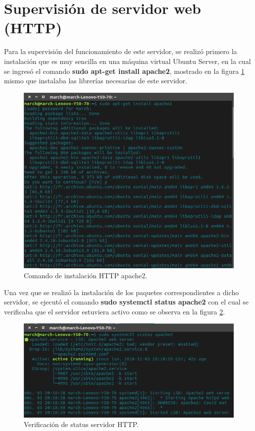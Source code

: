 \section{Supervisión de servidor web (HTTP)}
Para la supervisión del funcionamiento de este servidor, se realizó primero la instalación que es muy sencilla en una máquina virtual Ubuntu Server, en la cual se ingresó el comando \textbf{sudo apt-get install apache2}, mostrado en la figura \ref{image:http1} mismo que instalaba las librerías necesarias de este servidor.

\FloatBarrier
\begin{figure}[htbp!]
		\centering
			\includegraphics[width=.68 \textwidth]{images/http1}
		\caption{Comando de instalación HTTP apache2.}
		\label{image:http1}
\end{figure}
\FloatBarrier

Una vez que se realizó la instalación de los paquetes correspondientes a dicho servidor, se ejecutó el comando \textbf{sudo systemctl status apache2} con el cual se verificaba que el servidor estuviera activo como se observa en la figura \ref{image:http2}.

\FloatBarrier
\begin{figure}[htbp!]
		\centering
			\includegraphics[width=.75 \textwidth]{images/http2}
		\caption{Verificación de status servidor HTTP.}
		\label{image:http2}
\end{figure}
\FloatBarrier

